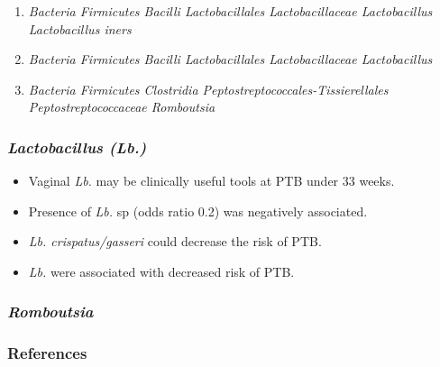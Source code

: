\documentclass{beamer}
\begin{document}
\begin{frame}[allowframebreaks]
        \begin{enumerate}[a]
            \item \textit{Bacteria Firmicutes Bacilli Lactobacillales Lactobacillaceae Lactobacillus Lactobacillus iners}
            \item \textit{Bacteria Firmicutes Bacilli Lactobacillales Lactobacillaceae Lactobacillus}
            \item \textit{Bacteria Firmicutes Clostridia Peptostreptococcales-Tissierellales Peptostreptococcaceae Romboutsia}
        \end{enumerate}
    \end{frame}

    \begin{frame}
        \frametitle{\textit{Lactobacillus (Lb.)}}

        \begin{itemize}
            \item Vaginal \textit{Lb.} may be clinically useful tools at PTB under 33 weeks. \cite{lb1}
            \item Presence of \textit{Lb.} sp (odds ratio 0.2) was negatively associated. \cite{lb2}
            \item \textit{Lb. crispatus/gasseri} could decrease the risk of PTB. \cite{lb3}
            \item \textit{Lb.} were associated with decreased risk of PTB. \cite{lb4}
        \end{itemize}
    \end{frame}

    \begin{frame}
        \frametitle{\textit{Romboutsia}}
    \end{frame}

   	\begin{frame}[allowframebreaks]
        \frametitle{References}
        
        
    \end{frame}
\end{document}

